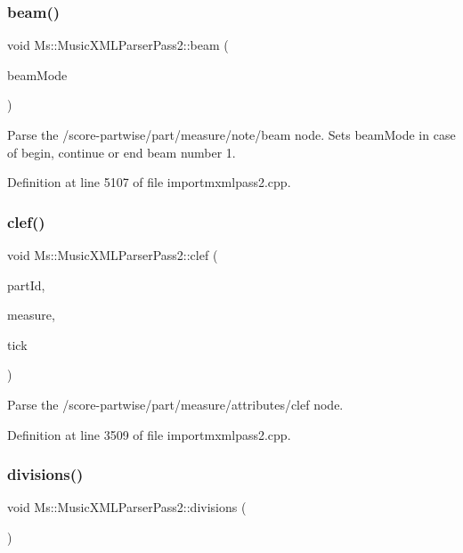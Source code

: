 \subsubsection{\texorpdfstring{beam()}{beam()}}
{\footnotesize\ttfamily void Ms\+::\+Music\+X\+M\+L\+Parser\+Pass2\+::beam (\begin{DoxyParamCaption}\item[{Beam\+::\+Mode \&}]{beam\+Mode }\end{DoxyParamCaption})}

Parse the /score-\/partwise/part/measure/note/beam node. Sets beam\+Mode in case of begin, continue or end beam number 1. 

Definition at line 5107 of file importmxmlpass2.\+cpp.

\mbox{\label{class_ms_1_1_music_x_m_l_parser_pass2_a4f419cca4f66e1c7a3ef9fc795e4d6e1}} 
\subsubsection{\texorpdfstring{clef()}{clef()}}
{\footnotesize\ttfamily void Ms\+::\+Music\+X\+M\+L\+Parser\+Pass2\+::clef (\begin{DoxyParamCaption}\item[{const Q\+String \&}]{part\+Id,  }\item[{\hyperlink{class_ms_1_1_measure}{Measure} $\ast$}]{measure,  }\item[{const int}]{tick }\end{DoxyParamCaption})}

Parse the /score-\/partwise/part/measure/attributes/clef node. 

Definition at line 3509 of file importmxmlpass2.\+cpp.

\mbox{\label{class_ms_1_1_music_x_m_l_parser_pass2_a78630279e14460f929c5c31ed2567fab}} 
\subsubsection{\texorpdfstring{divisions()}{divisions()}}
{\footnotesize\ttfamily void Ms\+::\+Music\+X\+M\+L\+Parser\+Pass2\+::divisions (\begin{DoxyParamCaption}{ }\end{DoxyParamCaption})}

